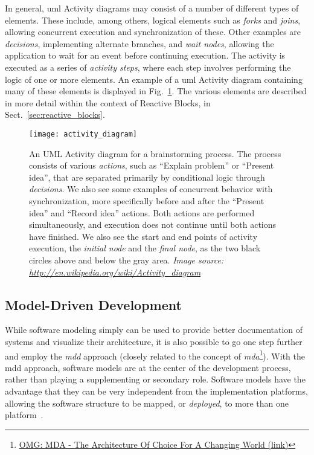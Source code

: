 \noindent
In general, \gls{uml} Activity diagrams may consist of a number of different types of elements. These include, among others, logical elements such as \emph{forks} and \emph{joins}, allowing concurrent execution and synchronization of these. Other examples are \emph{decisions}, implementing alternate branches, and \emph{wait nodes}, allowing the application to wait for an event before continuing execution.  The activity is executed as a series of \emph{activity steps}, where each step involves performing the logic of one or more elements. An example of a \gls{uml} Activity diagram containing many of these elements is displayed in Fig.~\ref{fig:activity_diagram}. The various elements are described in more detail within the context of Reactive Blocks, in Sect.~\ref{sec:reactive_blocks}.

\begin{figure}[htp]
	\centering
	\texttt{[image: activity\_diagram]}
	\caption[UML Activity Diagram]{An UML Activity diagram for a brainstorming process. The process consists of various \emph{actions}, such as ``Explain problem'' or ``Present idea'', that are separated primarily by conditional logic through \emph{decisions}. We also see some examples of concurrent behavior with synchronization, more specifically before and after the ``Present idea'' and ``Record idea'' actions. Both actions are performed simultaneously, and execution does not continue until both actions have finished. We also see the start and end points of activity execution, the \emph{initial node} and the \emph{final node}, as the two black circles above and below the gray area. \emph{Image source: \url{http://en.wikipedia.org/wiki/Activity_diagram}}}
	\label{fig:activity_diagram}
\end{figure}

\subsection{Model-Driven Development}
\label{sec:model_driven_development}
While software modeling simply can be used to provide better documentation of systems and visualize their architecture, it is also possible to go one step further and employ the \emph{\gls{mdd}} approach (closely related to the concept of \emph{\gls{mda}}\footnote{\href{http://www.omg.org/mda/}{OMG: MDA - The Architecture Of Choice For A Changing World (link)}}). With the \gls{mdd} approach, software models are at the center of the development process, rather than playing a supplementing or secondary role. Software models have the advantage that they can be very independent from the implementation platforms, allowing the software structure to be mapped, or \emph{deployed}, to more than one platform~\cite{braek:itut_methodologies, selic:model_driven_development}.

